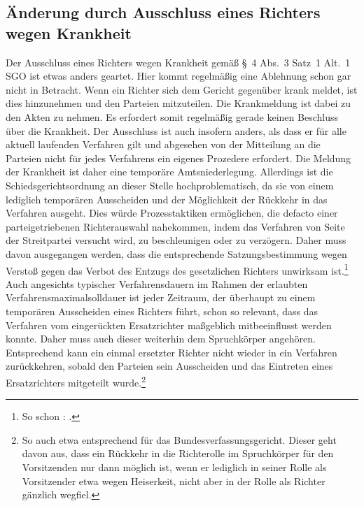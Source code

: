 \subsection{Änderung durch Ausschluss eines Richters wegen Krankheit}
\label{Zusammensetzung:Spruchkoerper:Krankheit}
Der Ausschluss eines Richters wegen Krankheit gemäß \S~4 Abs.~3 Satz~1 Alt.~1 SGO ist etwas anders geartet.
Hier kommt regelmäßig eine Ablehnung schon gar nicht in Betracht.
Wenn ein Richter sich dem Gericht gegenüber krank meldet, ist dies hinzunehmen und den Parteien mitzuteilen.
Die Krankmeldung ist dabei zu den Akten zu nehmen.
Es erfordert somit regelmäßig gerade keinen Beschluss über die Krankheit.
Der Ausschluss ist auch insofern anders, als dass er für alle aktuell laufenden Verfahren gilt und abgesehen von der Mitteilung an die Parteien nicht für jedes Verfahrens ein eigenes Prozedere erfordert.
Die Meldung der Krankheit ist daher eine temporäre Amtsniederlegung.
Allerdings ist die Schiedsgerichtsordnung an dieser Stelle hochproblematisch, da sie von einem lediglich temporären Ausscheiden und der Möglichkeit der Rückkehr in das Verfahren ausgeht.
Dies würde Prozesstaktiken ermöglichen, die defacto einer parteigetriebenen Richterauswahl nahekommen, indem das Verfahren von Seite der Streitpartei versucht wird, zu beschleunigen oder zu verzögern.
Daher muss davon ausgegangen werden, dass die entsprechende Satzungsbestimmung wegen Verstoß gegen das Verbot des Entzugs des gesetzlichen Richters unwirksam ist.\footnote{So schon \cite[299]{BVerfGE17294}: .}
Auch angesichts typischer Verfahrensdauern im Rahmen der erlaubten Verfahrensmaximalsolldauer ist jeder Zeitraum, der überhaupt zu einem temporären Ausscheiden eines Richters führt, schon so relevant, dass das Verfahren vom eingerückten Ersatzrichter maßgeblich mitbeeinflusst werden konnte.
Daher muss auch dieser weiterhin dem Spruchkörper angehören.
Entsprechend kann ein einmal ersetzter Richter nicht wieder in ein Verfahren zurückkehren, sobald den Parteien sein Ausscheiden und das Eintreten eines Ersatzrichters mitgeteilt wurde.\footnote{So auch etwa \cite[Eschelbach][\S~15 Rn~31]{BVerfGGMitarbeiterKommentar} entsprechend für das Bundesverfassungsgericht. Dieser geht davon aus, dass ein Rückkehr in die Richterolle im Spruchkörper für den Vorsitzenden nur dann möglich ist, wenn er lediglich in seiner Rolle als Vorsitzender etwa wegen Heiserkeit, nicht aber in der Rolle als Richter gänzlich wegfiel.}


